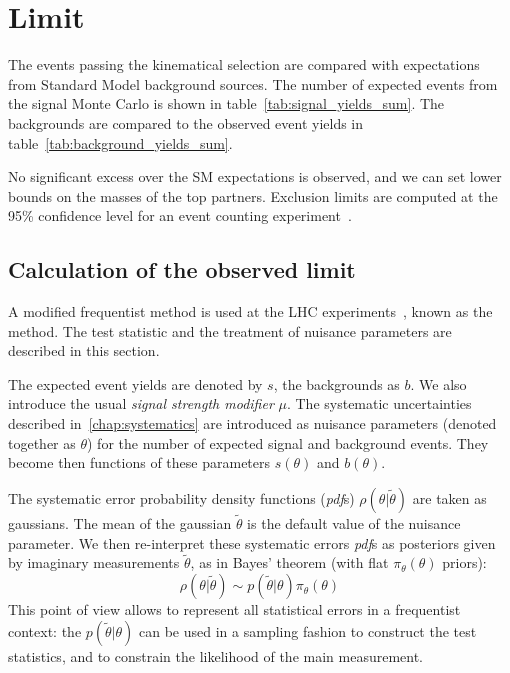 \chapter{Limit}
The events passing the kinematical selection are compared with expectations
from Standard Model background sources. The number of expected events from
the signal Monte Carlo is shown in table~\ref{tab:signal_yields_sum}. The
backgrounds are compared to the observed event yields in
table~\ref{tab:background_yields_sum}.


No significant excess over the SM expectations is observed, and we can set
lower bounds on the masses of the top partners.
Exclusion limits are computed at the 95\% confidence level for an event
counting experiment~\cite{2010acat.confE..57M}.

\section{Calculation of the observed limit}
A modified frequentist method is used at the LHC
experiments~\cite{ATLAS:1379837}, known as the \CLs method.
The test statistic and the treatment of nuisance parameters are described in
this section.

The expected \TP event yields are denoted by $s$, the backgrounds as
$b$. We also introduce the usual \emph{signal strength modifier} $\mu$.
The systematic uncertainties described in~\ref{chap:systematics} are
introduced as nuisance parameters (denoted together as $\theta$) for the number of expected signal and
background events. They become then functions of these parameters
$s(\theta)$ and $b(\theta)$.

The systematic error probability density functions (\emph{pdf}s) $\rho(\theta | \tilde\theta)$ are taken as
gaussians. The mean of the gaussian $\tilde \theta$ is the default value of
the nuisance parameter.
We then re-interpret these systematic errors \emph{pdf}s as posteriors given
by imaginary measurements $\tilde \theta$, as in Bayes' theorem (with flat
$\pi_\theta(\theta)$ priors):
\begin{equation*}
    \rho(\theta|\tilde \theta) \sim p(\tilde \theta | \theta)
    \pi_\theta(\theta)
\end{equation*}
This point of view allows to represent all statistical errors in a
frequentist context: the $p(\tilde \theta|\theta)$ can be used in a sampling
fashion to construct the test statistics, and to constrain the likelihood of
the main measurement.


